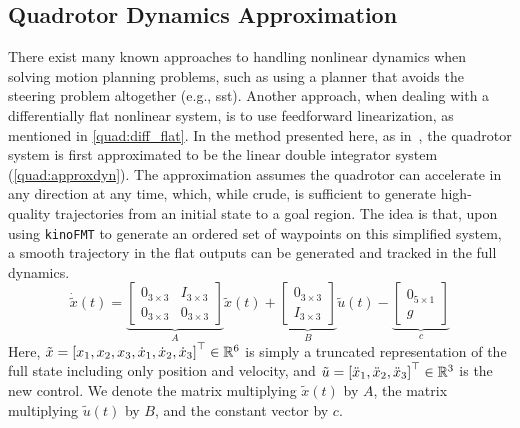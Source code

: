 \subsection{Quadrotor Dynamics Approximation}

There exist many known approaches to handling nonlinear dynamics when solving motion planning problems, such as using a planner that avoids the steering problem altogether (e.g., \gls{sst}). Another approach, when dealing with a differentially flat nonlinear system, is to use feedforward linearization, as mentioned in \autoref{quad:diff_flat}. In the method presented here, as in~\cite{Allen2016}, the quadrotor system is first approximated to be the linear double integrator system (\autoref{quad:approxdyn}). The approximation assumes the quadrotor can accelerate in any direction at any time, which, while crude, is sufficient to generate high-quality trajectories from an initial state to a goal region. The idea is that, upon using \texttt{kinoFMT} to generate an ordered set of waypoints on this simplified system, a smooth trajectory in the flat outputs can be generated and tracked in the full dynamics.
\begin{equation}
    \dot{\tilde{x}}(t) = 
    \underbrace{
    \begin{bmatrix}
        0_{3 \times 3} & I_{3 \times 3} \\
        0_{3 \times 3} & 0_{3 \times 3}
    \end{bmatrix}
    }_A \tilde{x}(t)
    +
    \underbrace{
    \begin{bmatrix}
            0_{3 \times 3} \\
            I_{3 \times 3}
    \end{bmatrix}
    }_B  \tilde{u}(t)
    -
    \underbrace{
    \begin{bmatrix}
        0_{5 \times 1} \\
        g
    \end{bmatrix}
    }_c
\label{quad:approxdyn}
\end{equation}
Here, $\tilde{x} = {[x_1, x_2, x_3, \dot{x}_1, \dot{x}_2, \dot{x}_3]}^\top \in \mathbb{R}^6$ is simply a truncated representation of the full state including only position and velocity, and $\tilde{u} = {[\ddot{x}_1, \ddot{x}_2, \ddot{x}_3]}^\top \in \mathbb{R}^3$  is the new control. We denote the matrix multiplying $\tilde{x}(t)$ by $A$, the matrix multiplying $\tilde{u}(t)$ by $B$, and the constant vector by $c$.


